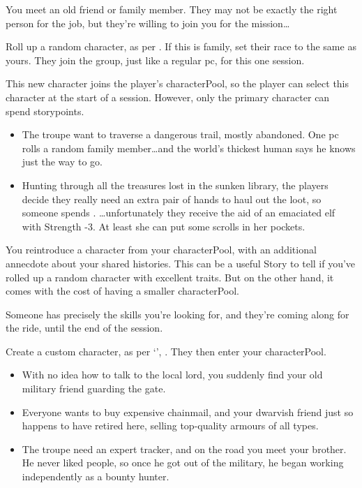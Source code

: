 \begin{multicols}{2}
\label{oldFriend}
You meet an old friend or family member.
They may not be exactly the right person for the job, but they're willing to join you for the mission\ldots

Roll up a random character, as per .
If this is family, set their race to the same as yours.
They join the group, just like a regular \gls{pc}, for this one session.

This new character joins the player's \gls{characterPool}, so the player can select this character at the start of a session.
However, only the primary character can spend \glspl{storypoint}.

\begin{itemize}
  \item
  The troupe want to traverse a dangerous trail, mostly abandoned.
  One \gls{pc} rolls a random family member\ldots and the world's thickest human says he knows just the way to go.
  \item
  Hunting through all the treasures lost in the sunken library, the players decide they really need an extra pair of hands to haul out the loot, so someone spends .
  \ldots unfortunately they receive the aid of an emaciated elf with Strength -3.
  At least she can put some scrolls in her pockets.
\end{itemize}

\label{returnFriend}
You reintroduce a character from your \gls{characterPool}, with an additional annecdote about your shared histories.
This can be a useful Story to tell if you've rolled up a random character with excellent \glspl{trait}.
But on the other hand, it comes with the cost of having a smaller \gls{characterPool}.

\label{designCharacter}
Someone has precisely the skills you're looking for, and they're coming along for the ride, until the end of the session.

Create a custom character, as per `', .
They then enter your \gls{characterPool}.

\begin{itemize}
  \item
  With no idea how to talk to the local lord, you suddenly find your old military friend guarding the gate.
  \item
  Everyone wants to buy expensive chainmail, and your dwarvish friend just so happens to have retired here, selling top-quality armours of all types.
  \item
  The troupe need an expert tracker, and on the road you meet your brother.
  He never liked people, so once he got out of the military, he began working independently as a bounty hunter.
\end{itemize}


\end{multicols}
